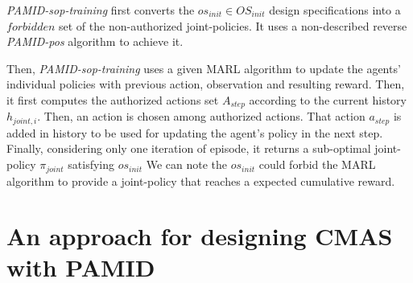 \documentclass[runningheads]{llncs}
\begin{document}
\emph{PAMID-sop-training} first converts the $os_{init} \in OS_{init}$ design specifications into a $forbidden$ set of the non-authorized joint-policies. It uses a non-described reverse \emph{PAMID-pos} algorithm to achieve it.

Then, \emph{PAMID-sop-training} uses a given MARL algorithm to update the agents' individual policies with previous action, observation and resulting reward. Then, it first computes the authorized actions set $A_{step}$ according to the current history $h_{joint,i}$. Then, an action is chosen among authorized actions. That action $a_{step}$ is added in history to be used for updating the agent's policy in the next step. 
Finally, considering only one iteration of episode, it returns a sub-optimal joint-policy $\pi_{joint}$ satisfying $os_{init}$
We can note the $os_{init}$ could forbid the MARL algorithm to provide a joint-policy that reaches a expected cumulative reward.


\section{An approach for designing CMAS with PAMID}





\end{document}
